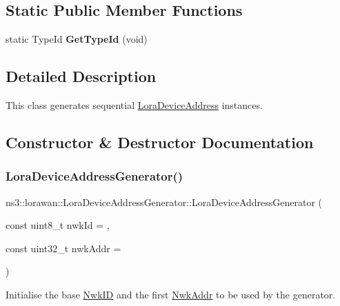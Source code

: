 \subsection*{Static Public Member Functions}
\begin{DoxyCompactItemize}
\item 
\mbox{\label{classns3_1_1lorawan_1_1LoraDeviceAddressGenerator_ab359d7b536a57574b15f71c4b304c292}} 
static Type\+Id {\bfseries Get\+Type\+Id} (void)
\end{DoxyCompactItemize}


\subsection{Detailed Description}
This class generates sequential \hyperlink{classns3_1_1lorawan_1_1LoraDeviceAddress}{Lora\+Device\+Address} instances. 

\subsection{Constructor \& Destructor Documentation}
\mbox{\label{classns3_1_1lorawan_1_1LoraDeviceAddressGenerator_afb0a91944592c3f390c528bc4a87574d}} 
\subsubsection{\texorpdfstring{Lora\+Device\+Address\+Generator()}{LoraDeviceAddressGenerator()}}
{\footnotesize\ttfamily ns3\+::lorawan\+::\+Lora\+Device\+Address\+Generator\+::\+Lora\+Device\+Address\+Generator (\begin{DoxyParamCaption}\item[{const uint8\+\_\+t}]{nwk\+Id = {},  }\item[{const uint32\+\_\+t}]{nwk\+Addr = {} }\end{DoxyParamCaption})}

Initialise the base \hyperlink{classns3_1_1lorawan_1_1NwkID}{Nwk\+ID} and the first \hyperlink{classns3_1_1lorawan_1_1NwkAddr}{Nwk\+Addr} to be used by the generator.

